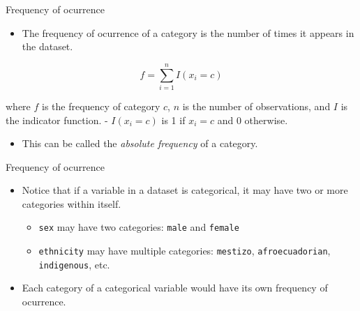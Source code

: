 \documentclass[
  10pt,
  ignorenonframetext,
]{beamer}
\providecommand{\tightlist}{%
  \setlength{\itemsep}{0pt}\setlength{\parskip}{0pt}}\usepackage{longtable,booktabs,array}
\begin{document}
\begin{frame}{Frequency of ocurrence}
\label{frequency-of-ocurrence}
\begin{itemize}
\tightlist
\item
  The frequency of ocurrence of a category is the number of times it
  appears in the dataset.
\end{itemize}

\[ f = \sum_{i=1}^{n} I(x_i = c) \]

where \(f\) is the frequency of category \(c\), \(n\) is the number of
observations, and \(I\) is the indicator function. - \(I(x_i = c)\) is 1
if \(x_i = c\) and 0 otherwise.

\begin{itemize}
\tightlist
\item
  This can be called the \emph{absolute frequency} of a category.
\end{itemize}
\end{frame}

\begin{frame}[fragile]{Frequency of ocurrence}
\label{frequency-of-ocurrence-1}
\begin{itemize}
\tightlist
\item
  Notice that if a variable in a dataset is categorical, it may have two
  or more categories within itself.

  \begin{itemize}
  \tightlist
  \item
    \texttt{sex} may have two categories: \texttt{male} and
    \texttt{female}
  \item
    \texttt{ethnicity} may have multiple categories: \texttt{mestizo},
    \texttt{afroecuadorian}, \texttt{indigenous}, etc.
  \end{itemize}
\item
  Each category of a categorical variable would have its own frequency
  of ocurrence.
\end{itemize}
\end{frame}
\end{document}
